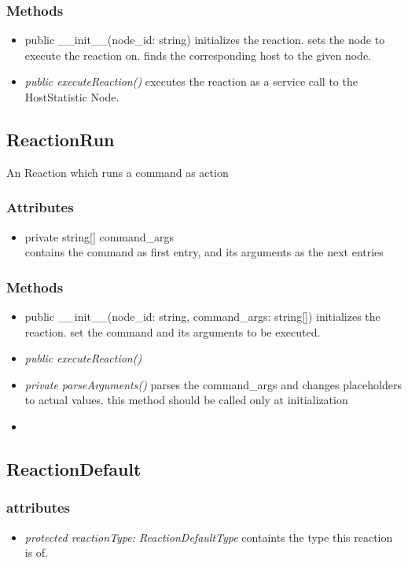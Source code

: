 \subsubsection{Methods}
\begin{itemize}
	\item public \_\_init\_\_(node\_id: string)
		initializes the reaction. sets the node to execute the reaction on. finds the corresponding host to the given node.
	\item \textit{ public executeReaction() }
		executes the reaction as a service call to the HostStatistic Node.
\end{itemize}


\subsection{ReactionRun}
	An Reaction which runs a command as action 
\subsubsection{Attributes}
\begin{itemize}
	\item private string[] command\_args
	\\ contains the command as first entry, and its arguments as the next entries
\end{itemize}
\subsubsection{Methods}
\begin{itemize}
	\item public \_\_init\_\_(node\_id: string, command\_args: string[])
		initializes the reaction. set the command and its arguments to be executed.
	\item \textit{ public executeReaction() }
	\item \textit{ private parseArguments() }
		parses the command\_args and changes placeholders to actual values. this method should be called only at initialization
	\item 
\end{itemize}


\subsection{ReactionDefault}
\subsubsection{attributes}
\begin{itemize}
	\item \textit{ protected reactionType: ReactionDefaultType }
		containts the type this reaction is of.
\end{itemize}
